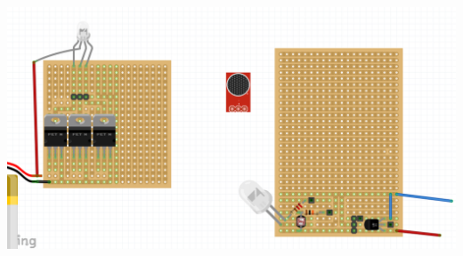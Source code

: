 \documentclass[12pt]{article}
\begin{document}
\includegraphics[scale=0.5]{stripBoard}
\end{document}
